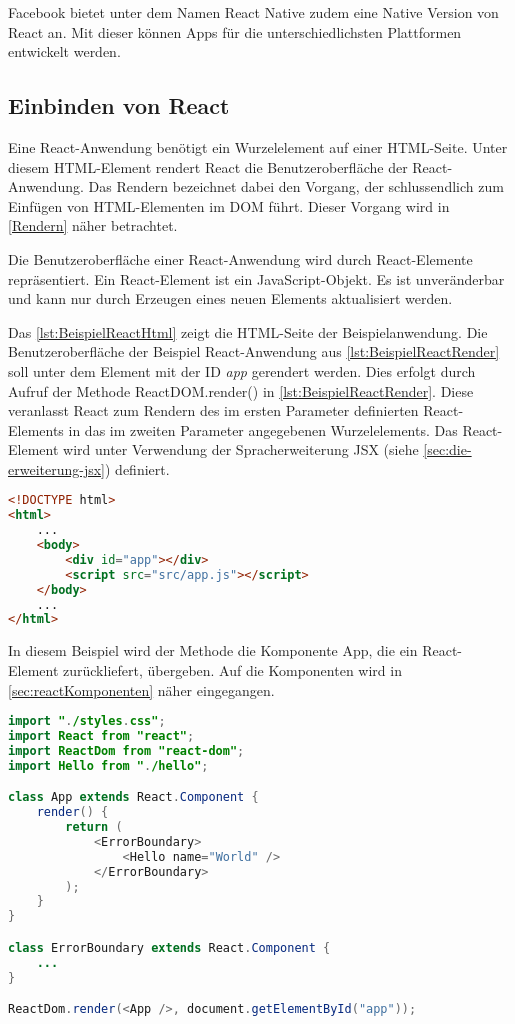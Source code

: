Facebook bietet unter dem Namen React Native zudem eine Native Version von React an. Mit dieser können Apps für die unterschiedlichsten Plattformen entwickelt werden.\autocite{Facebook.2019}

\label{ReactNative}
\subsection{Einbinden von React}\label{sec:rWurz}

Eine React-Anwendung benötigt ein Wurzelelement auf einer HTML-Seite. Unter diesem HTML-Element rendert React die Benutzeroberfläche der React-Anwendung. Das Rendern bezeichnet dabei den Vorgang, der schlussendlich zum Einfügen von HTML-Elementen im DOM führt. Dieser Vorgang wird in \autoref{Rendern} näher betrachtet. 

Die Benutzeroberfläche einer React-Anwendung wird durch React-Elemente repräsentiert. Ein React-Element ist ein JavaScript-Objekt. Es ist unveränderbar und kann nur durch Erzeugen eines neuen Elements aktualisiert werden.

Das \autoref{lst:BeispielReactHtml} zeigt die HTML-Seite der Beispielanwendung. Die Benutzeroberfläche der Beispiel React-Anwendung aus \autoref{lst:BeispielReactRender} soll unter dem Element mit der ID \textit{app} gerendert werden. Dies erfolgt durch Aufruf der Methode \glqq ReactDOM.render() \grqq in \autoref{lst:BeispielReactRender}. Diese veranlasst React zum Rendern des im ersten Parameter definierten React-Elements in das im zweiten Parameter angegebenen Wurzelelements. Das React-Element wird unter Verwendung der Spracherweiterung JSX (siehe \autoref{sec:die-erweiterung-jsx}) definiert.

\begin{lstlisting}[caption=Beispiel React-Anwendung: HTML-Datei , label=lst:BeispielReactHtml, language=HTML]
<!DOCTYPE html>
<html>
	...
	<body>
		<div id="app"></div>
		<script src="src/app.js"></script>
	</body>
	...
</html>
\end{lstlisting}

In diesem Beispiel wird der Methode die Komponente App, die ein React-Element zurückliefert, übergeben. Auf die Komponenten wird in \autoref{sec:reactKomponenten} näher eingegangen. \autocites[vgl.][4\psqq, 26\psqq]{Zeigermann.2016}[vgl.][]{Facebook.2018}[vgl.][]{Facebook.2018c}[vgl.][2\psqq]{Stefanov.2017}


\begin{lstlisting}[caption=Beispiel React-Anwendung: Aufruf der Render-Methode, label=lst:BeispielReactRender, language=Java]
import "./styles.css";
import React from "react";
import ReactDom from "react-dom";
import Hello from "./hello";

class App extends React.Component {
	render() {	
		return (
			<ErrorBoundary>
				<Hello name="World" />
			</ErrorBoundary>
		);
	}
}

class ErrorBoundary extends React.Component {
	...	
}

ReactDom.render(<App />, document.getElementById("app"));
\end{lstlisting}


